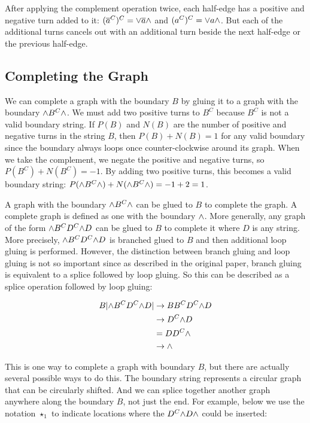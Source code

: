 \documentclass[acmtog]{acmart}
\begin{document}
After applying the complement operation twice, each half-edge has a positive 
and negative turn added to it: $(\overline{a}^C)^C = {\vee} \overline{a} {\wedge}$ and
$(a^C)^C = {\vee} a {\wedge}$. But each of the additional turns cancels out with an
additional turn beside the next half-edge or the previous half-edge.

\subsection{Completing the Graph}
\label{completing}

We can complete a graph with the boundary $B$ by gluing it to a graph with the
boundary $ {\wedge} B^C {\wedge}$. We must add two positive turns to $B^C$ because $B^C$ is
not a valid boundary string. If $P(B)$ and $N(B)$ are the number of positive and
negative turns in the string $B$, then $P(B) + N(B) = 1$ for any valid boundary
since the boundary always loops once counter-clockwise around its graph. When we
take the complement, we negate the positive and negative turns, so
$P(B^C) + N(B^C) = -1$. By adding two positive turns, this becomes a valid
boundary string: $P( {\wedge} B^C {\wedge}) + N({\wedge} B^C {\wedge}) = -1 + 2 = 1$.

A graph with the boundary ${\wedge} B^C {\wedge}$ can be glued to $B$ to complete the 
graph. A complete graph is defined as one with the boundary ${\wedge}$. More 
generally, any graph of the form ${\wedge} B^C D^C {\wedge} D$ can be glued to $B$ to 
complete it where $D$ is any string. More precisely, ${\wedge} B^C D^C {\wedge} D$ is 
branched glued to $B$ and then additional loop gluing is performed. However,
the distinction between branch gluing and loop gluing is not so important since
as described in the original paper, branch gluing is equivalent to a splice 
followed by loop gluing. So this can be described as a splice operation 
followed by loop gluing:

\begin{equation}
\begin{split}
B|{\wedge} B^C D^C {\wedge} D| & \rightarrow BB^C D^C {\wedge} D \\
                     & \rightarrow D^C {\wedge} D \\
                     & = DD^C {\wedge} \\
                     & \rightarrow {\wedge} \\ 
\end{split}
\end{equation}

This is one way to complete a graph with boundary $B$, but there are actually 
several possible ways to do this. The boundary string 
represents a circular graph that can be circularly shifted. And we can splice 
together another graph anywhere along the boundary $B$, not just the end. For
example, below we use the notation $\star_1$ to indicate locations where the
$D^C {\wedge} D {\wedge}$ could be inserted:
\end{document}
